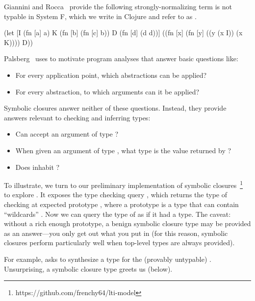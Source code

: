 \documentclass[11pt]{iuthesis}
\begin{document}

Giannini and Rocca~\cite{giannini1988characterization}
provide the following strongly-normalizing term is not typable in System F,
which we write in Clojure and refer to as \GRterm.

\begin{cljlisting}
(let [I (fn [a] a)
      K (fn [b] (fn [c] b))
      D (fn [d] (d d))]
  ((fn [x] (fn [y] ((y (x I))
                    (x K))))
   D))
\end{cljlisting}

Palsberg~\cite{Palsberg:1995:CAC:200994.201001}
uses \GRterm to motivate program analyses
that answer basic questions like:
\begin{itemize}
  \item For every application point, which abstractions can be applied?
  \item For every abstraction, to which arguments can it be applied?
\end{itemize}
Symbolic closures answer neither of these questions.
Instead, they provide answers relevant to checking and inferring types:
\begin{itemize}
  \item Can \GRterm accept an argument of type \ltiT{}?
  \item When given an argument of type \ltiT{}, what type is the value returned by \GRterm?
  \item Does \GRterm inhabit \ltiFn{\ltiT{}}{\ltiS{}}?
\end{itemize}

To illustrate, we turn to
our preliminary implementation of symbolic closures~\footnote{https://github.com/frenchy64/lti-model}
to explore \GRterm.
It exposes the type checking query ,
which returns the type of checking  at expected prototype ,
where a prototype is a type that can contain ``wildcards'' .
Now we can query the type of \GRterm as if it had a type.
The caveat: without a rich enough prototype,
a benign symbolic closure type may be provided as an answer---you only get out what you put in
(for this reason, symbolic closures perform particularly well when top-level types are always provided).

For example,  asks to synthesize a type for the (provably untypable) \GRterm.
Unsurprising, a symbolic closure type greets us (below).
\end{document}
